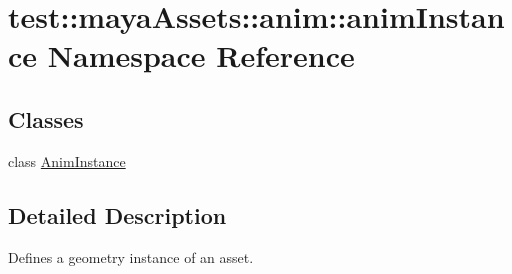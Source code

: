\hypertarget{namespacetest_1_1mayaAssets_1_1anim_1_1animInstance}{\section{test\-:\-:maya\-Assets\-:\-:anim\-:\-:anim\-Instance \-Namespace \-Reference}
\label{d5/d4b/namespacetest_1_1mayaAssets_1_1anim_1_1animInstance}
}
\subsection*{\-Classes}
\begin{DoxyCompactItemize}
\item 
class \hyperlink{classtest_1_1mayaAssets_1_1anim_1_1animInstance_1_1AnimInstance}{\-Anim\-Instance}
\end{DoxyCompactItemize}


\subsection{\-Detailed \-Description}
\begin{DoxyVerb}
Defines a geometry instance of an asset.
\end{DoxyVerb}
 